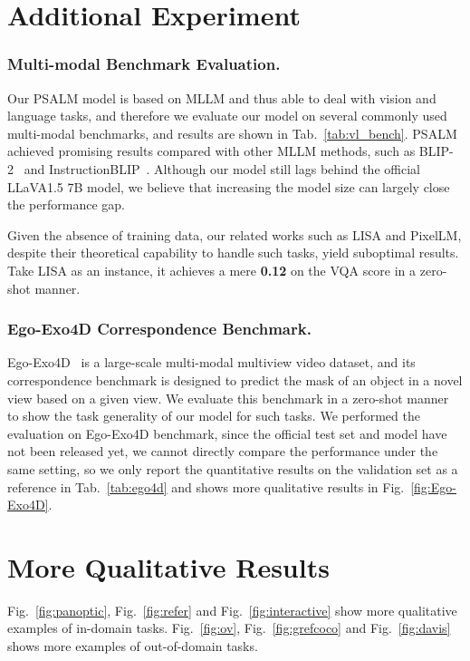 \section{Additional Experiment}
\subsubsection{Multi-modal Benchmark Evaluation.} 

Our PSALM model is based on MLLM and thus able to deal with vision and language tasks, and therefore we evaluate our model on several commonly used multi-modal benchmarks, and results are shown in Tab.~\ref{tab:vl_bench}. PSALM achieved promising results compared with other MLLM methods, such as BLIP-2~\cite{blip2} and InstructionBLIP~\cite{dai2024instructblip}. Although our model still lags behind the official LLaVA1.5 7B model, we believe that increasing the model size can largely close the performance gap.

Given the absence of training data, our related works such as LISA\cite{lisa} and PixelLM\cite{pixellm}, despite their theoretical capability to handle such tasks, yield suboptimal results. Take LISA as an instance, it achieves a mere \textbf{0.12} on the VQA score in a zero-shot manner.

\subsubsection{Ego-Exo4D Correspondence Benchmark.} 
Ego-Exo4D~\cite{egoexo} is a large-scale multi-modal multiview video dataset, and its correspondence benchmark is designed to predict the mask of an object in a novel view based on a given view. We evaluate this benchmark in a zero-shot manner to show the task generality of our model for such tasks. 
We performed the evaluation on Ego-Exo4D benchmark, since the official test set and model have not been released yet, we cannot directly compare the performance under the same setting, so we only report the quantitative results on the validation set as a reference in Tab.~\ref{tab:ego4d} and shows more qualitative results in Fig.~\ref{fig:Ego-Exo4D}. 

\section{More Qualitative Results}
Fig.~\ref{fig:panoptic}, Fig.~\ref{fig:refer} and Fig.~\ref{fig:interactive} show more qualitative examples of in-domain tasks. Fig.~\ref{fig:ov}, Fig.~\ref{fig:grefcoco} and Fig.~\ref{fig:davis} shows more examples of out-of-domain tasks.


